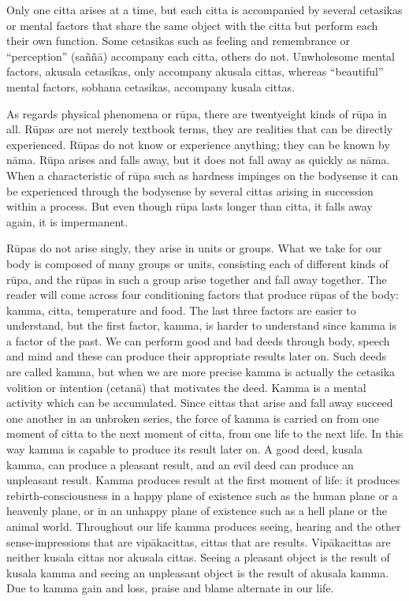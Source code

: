 \documentclass{book}
\begin{document}
Only one citta arises at a time, but each citta is accompanied by
several cetasikas or mental factors that share the same object with the
citta but perform each their own function. Some cetasikas such as
feeling and remembrance or ``perception'' (sa\~n\~n{\=a}) accompany
each citta, others do not. Unwholesome mental factors, akusala
cetasikas, only accompany akusala cittas, whereas ``beautiful'' mental
factors, sobhana cetasikas, accompany kusala cittas. 




As regards physical phenomena or r\=upa, there are twentyeight kinds of
r\=upa in all. R\=upas are not merely textbook terms, they are
realities that can be directly experienced. R\=upas do not know or
experience anything; they can be known by n{\=a}ma. R\=upa arises and
falls away, but it does not fall away as quickly as n{\=a}ma. When a
characteristic of r\=upa such as hardness impinges on the bodysense it
can be experienced through the bodysense by several cittas arising in
succession within a process. But even though r\=upa lasts longer than
citta, it falls away again, it is impermanent. 

R\=upas do not arise singly, they arise in units or groups. What we take
for our body is composed of many groups or units, consisting each of
different kinds of r\=upa, and the r\=upas in such a group arise
together and fall away together. The reader will come across four
conditioning factors that produce r\=upas of the body: kamma, citta,
temperature and food. The last three factors are easier to understand,
but the first factor, kamma, is harder to understand since kamma is a
factor of the past. We can perform good and bad deeds through body,
speech and mind and these can produce their appropriate results later
on. Such deeds are called kamma, but when we are more precise kamma is
actually the cetasika volition or intention (cetan{\=a}) that motivates
the deed. Kamma is a mental activity which can be accumulated. Since
cittas that arise and fall away succeed one another in an unbroken
series, the force of kamma is carried on from one moment of citta to
the next moment of citta, from one life to the next life. In this way
kamma is capable to produce its result later on. A good deed, kusala
kamma, can produce a pleasant result, and an evil deed can produce an
unpleasant result. Kamma produces result at the first moment of life:
it produces rebirth-consciousness in a happy plane of existence such
as the human plane or a heavenly plane, or in an unhappy plane of
existence such as a hell plane or the animal world. Throughout our life
kamma produces seeing, hearing and the other sense-impressions that
are vip{\=a}kacittas, cittas that are results. Vip{\=a}kacittas are
neither kusala cittas nor akusala cittas. Seeing a pleasant object is
the result of kusala kamma and seeing an unpleasant object is the
result of akusala kamma. Due to kamma gain and loss, praise and blame
alternate in our life. 
\end{document}

